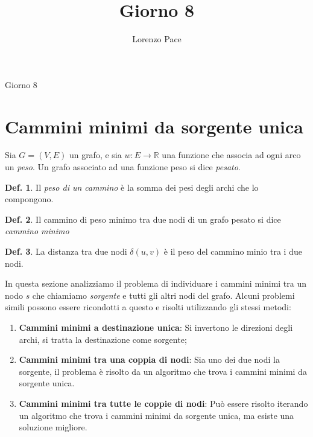 \documentclass[a4paper,10pt]{article}
\title{Giorno 8}
\author{Lorenzo Pace}
\theoremstyle{definition}
\newtheorem{deff}{Def.}[section]
\newcommand{\reals}{\mathbb{R}}
\begin{document}
\begin{center}
    \LARGE Giorno 8
\end{center}
\section{Cammini minimi da sorgente unica}

Sia $G = (V, E)$ un grafo, e sia $w:E \to \reals$ una funzione che associa ad ogni arco un \emph{peso}. Un grafo associato ad una funzione peso si dice \emph{pesato}.
\begin{deff}
    Il \emph{peso di un cammino} è la somma dei pesi degli archi che lo compongono.
\end{deff}
\begin{deff}
    Il cammino di peso minimo tra due nodi di un grafo pesato si dice \emph{cammino minimo}
\end{deff}
\begin{deff}
   La distanza tra due nodi $\delta(u, v)$ è il peso del cammino minio tra i due nodi.
\end{deff}


In questa sezione analizziamo il problema di individuare i cammini minimi tra un nodo $s$ che chiamiamo \emph{sorgente} e tutti gli altri nodi del grafo. Alcuni problemi simili possono essere ricondotti a questo e risolti utilizzando gli stessi metodi:
\begin{enumerate}
 \item \textbf{Cammini minimi a destinazione unica}: Si invertono le direzioni degli archi, si tratta la destinazione come sorgente;
 \item \textbf{Cammini minimi tra una coppia di nodi}: Sia uno dei due nodi la sorgente, il problema è risolto da un algoritmo che trova i cammini minimi da sorgente unica.
 \item \textbf{Cammini minimi tra tutte le coppie di nodi}: Può essere risolto iterando un algoritmo che trova i cammini minimi da sorgente unica, ma esiste una soluzione migliore.
\end{enumerate}
\end{document}
